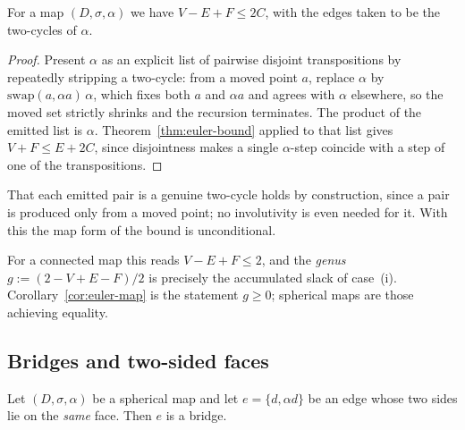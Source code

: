 \begin{corollary}\label{cor:euler-map}
For a map $(D,\sigma,\alpha)$ we have $V - E + F \le 2C$, with the edges
taken to be the two-cycles of $\alpha$.
\end{corollary}

\begin{proof}
Present $\alpha$ as an explicit list of pairwise disjoint transpositions by
repeatedly stripping a two-cycle: from a moved point $a$, replace $\alpha$
by $\mathrm{swap}(a, \alpha a)\,\alpha$, which fixes both $a$ and $\alpha a$
and agrees with $\alpha$ elsewhere, so the moved set strictly shrinks and
the recursion terminates. The product of the emitted list is $\alpha$.
Theorem~\ref{thm:euler-bound} applied to that list gives $V + F \le E + 2C$,
since disjointness makes a single $\alpha$-step coincide with a step of one
of the transpositions.
\end{proof}

\begin{remark}
That each emitted pair is a genuine two-cycle holds by construction, since a
pair is produced only from a moved point; no involutivity is even needed for
it. With this the map form of the bound is unconditional.
\end{remark}

\begin{remark}\label{rem:genus}
For a connected map this reads $V - E + F \le 2$, and the \emph{genus}
$g := (2 - V + E - F)/2$ is precisely the accumulated slack of case~(i).
Corollary~\ref{cor:euler-map} is the statement $g \ge 0$; spherical maps
are those achieving equality.
\end{remark}

\subsection{Bridges and two-sided faces}

\begin{theorem}\label{thm:same-face-bridge}
Let $(D,\sigma,\alpha)$ be a spherical map and let $e = \{d, \alpha d\}$ be
an edge whose two sides lie on the \emph{same} face. Then $e$ is a bridge.
\end{theorem}

